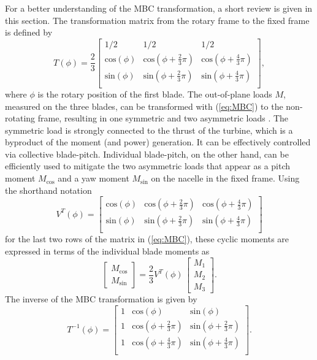 \documentclass[times]{weauth}
\newcommand{\ba}{\left [ \begin{array}}
\newcommand{\ea}{\end{array} \right ]}
\begin{document}
For a better understanding of the MBC transformation, a short review is given in
this section.
The transformation matrix from the rotary frame to the fixed frame is defined by
\begin{equation}\label{eq:MBC}
T(\phi) =
\frac{2}{3}\ba{ccc}
1/2 & 1/2 &  1/2\\
\text{cos}(\phi) &  \text{cos}(\phi+ \frac{2}{3}\pi) &  \text{cos}(\phi+ \frac{4}{3}\pi)\\
\text{sin}(\phi) &  \text{sin}(\phi+ \frac{2}{3}\pi) &  \text{sin}(\phi+ \frac{4}{3}\pi)\\
\ea,
\end{equation}
where $\phi$ is the rotary position of the first blade. The out-of-plane loads
$M$, measured on the three blades, can be transformed with (\ref{eq:MBC}) to the
non-rotating frame, resulting in one symmetric and two asymmetric loads
\cite{bir97}. The symmetric load is strongly connected to the thrust of the
turbine, which is a byproduct of the moment (and power) generation. It can be
effectively controlled via collective blade-pitch. Individual blade-pitch, on
the other hand, can be efficiently used to mitigate the two asymmetric loads
that appear as a pitch moment $M_\text{cos}$ and a yaw moment $M_\text{sin}$
on the nacelle in the fixed frame.
%
%
%
%
%
Using the shorthand notation
\begin{equation}\label{eq:projection}
V^T\!(\phi) = 	\ba{ccc}
\text{cos}(\phi) &  \text{cos}(\phi+ \frac{2}{3}\pi) &  \text{cos}(\phi+ \frac{4}{3}\pi)\\
\text{sin}(\phi) &  \text{sin}(\phi+ \frac{2}{3}\pi) &  \text{sin}(\phi+ \frac{4}{3}\pi)\\
\ea
\end{equation}
for the last two rows of the matrix in (\ref{eq:MBC}),
these cyclic moments are expressed in terms of the individual blade moments as
\begin{equation}\label{eq:mbc_output}
\begin{bmatrix}
M_\text{cos} \\ M_\text{sin}
\end{bmatrix}
=
\frac{2}{3} V^T\!(\phi)\,
\begin{bmatrix}
M_{1} \\ M_{2} \\ M_{3}
\end{bmatrix}.
\end{equation}
%
The inverse of the MBC transformation is given by
\begin{equation}\label{eq:iMBC}
T^{-1}(\phi) =
\ba{ccc}
1& \text{cos}( \phi) & \text{sin}(\phi) \\
1& \text{cos}(\phi+ \frac{2}{3}\pi) &  \text{sin}(\phi+ \frac{2}{3}\pi) \\
1&\text{cos}(\phi+ \frac{4}{3}\pi) &  \text{sin}(\phi+ \frac{4}{3}\pi) \\
\ea.
\end{equation}
\end{document}
